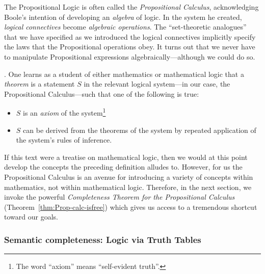 
\medskip

The Propositional Logic is often called the {\it Propositional
  Calculus},  acknowledging Boole's
intention of developing an {\em algebra} of logic.  In the system he
created, {\em logical connectives} become {\em algebraic operations}.
The ``set-theoretic analogues'' that we have specified as we
introduced the logical connectives implicitly specify the laws that
the Propositional operations obey.  It turns out that we never have to
manipulate Propositional expressions algebraically---although we could
do so.

\bigskip

.
One learns as a student of either mathematics or mathematical logic
that a {\it theorem} is a statement $S$ in the relevant logical
system---in our case, the Propositional Calculus---such that one of
the following is true:
\begin{itemize}
\item
$S$ is an {\it axiom} of the system\footnote{The word ``axiom'' means ``self-evident truth''.}
\item
$S$ can be derived from the theorems of the system by repeated
  application of the system's rules of inference.
\end{itemize}
If this text were a treatise on mathematical logic, then we would at
this point develop the concepts the preceding definition alludes to.
However, for us the Propositional Calculus is an avenue for
introducing a variety of concepts within mathematics, not within
mathematical logic.  Therefore, in the next section, we invoke the
powerful {\it Completeness Theorem for the Propositional Calculus}
(Theorem~\ref{thm:Prop-calc-isfree}) which gives us access to a
tremendous shortcut toward our goals.


\subsubsection{Semantic completeness: Logic via Truth Tables}
\label{sec:truth-tables}

